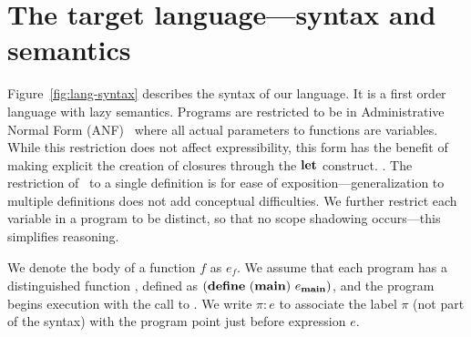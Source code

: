 \documentclass[preprint, 9pt]{sigplanconf}
\newcommand{\warning}[1]{{\color{Myred}{#1}}}
\begin{document}
\section{The target language---syntax and semantics}
\label{sec:defs}
Figure~\ref{fig:lang-syntax} describes the syntax  of our language. It
is a first order language with lazy semantics. Programs are restricted
to        be        in        Administrative        Normal        Form
(ANF)~\cite{chakravarty03perspective} where  all actual  parameters to
functions  are  variables.  While  this  restriction  does not  affect
expressibility,  this form  has  the benefit  of  making explicit  the
creation of  closures through  the $\LET$  construct.  \warning{ For
  now, we assume  $\LET$s  in our
language  are non-recursive;  in the  expression $\LET\,\,  x \leftarrow  s\,\,
\IN\,\, e$, $x$ should not occur in  $s$}. The  restriction of \LET\ to  a single
definition  is for  ease  of  exposition---generalization to  multiple
definitions does not add conceptual difficulties.  We further restrict
each variable in a program to  be distinct, so that no scope shadowing
occurs---this  simplifies  reasoning.  


We denote the body of a function ${\mathit  f}$   as $e_{\mathit f}$.
 We assume that each program has a distinguished function
\mainpgm,    defined as    $(\mbox{$\mathbf{define}$}\      ({\tt
  \mathbf{main}})\  e_{\mathbf{main}})$,  and  the program begins execution
with the call to \mainpgm.  We write $\pi\!:\!e$ to associate the label
$\pi$ (not  part of the syntax) with the  program point just
before expression $e$.
\end{document}
